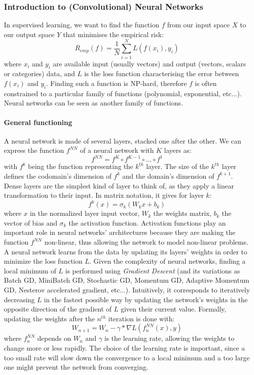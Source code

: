 \documentclass{article}
\begin{document}
\subsubsection{Introduction to (Convolutional) Neural Networks}
\label{sec:cnn}

In supervised learning, we want to find the function $f$ from our input space $X$ to our output space $Y$ that minimises the empirical risk:
$$R_{emp}(f) = \frac{1}{N}\sum_{i=1}^N L(f(x_i), y_i)$$
where $x_i$ and $y_i$ are available input (usually vectors) and output (vectors, scalars or categories) data, and $L$ is the loss function characterising the error between $f(x_i)$ and $y_i$. Finding such a function is NP-hard, therefore $f$ is often constrained to a particular family of functions (polynomial, exponential, etc...). Neural networks can be seen as another family of functions.

\paragraph{General functioning}
A neural network is made of several layers, stacked one after the other. We can express the function $f^{NN}$ of a neural network with $K$ layers as:
$$f^{NN} = f^K \circ f^{K-1} \circ ... \circ f^1$$
with $f^k$ being the function representing the $k^{th}$ layer. The size of the $k^{th}$ layer defines the codomain's dimension of $f^k$ and the domain's dimension of $f^{k+1}$. \\
Dense layers are the simplest kind of layer to think of, as they apply a linear transformation to their input. In matrix notation, it gives for layer $k$:
$$f^k(x) = \sigma_k(W_kx+b_k)$$
where $x$ in the normalized layer input vector, $W_k$ the weights matrix, $b_k$ the vector of bias and $\sigma_k$ the activation function. Activation functions play an important role in neural networks' architectures because they are making the function $f^{NN}$ non-linear, thus allowing the network to model non-linear problems. \\
A neural network learns from the data by updating its layers' weights in order to minimize the loss function $L$. Given the complexity of neural networks, finding a local minimum of $L$ is performed using \textit{Gradient Descent} (and its variations as Batch GD, MiniBatch GD, Stochastic GD, Momentum GD, Adaptive Momentum GD, Nesterov accelerated gradient, etc...). Intuitively, it corresponds to iteratively decreasing $L$ in the fastest possible way by updating the network's weights in the opposite direction of the gradient of $L$ given their current value. Formally, updating the weights after the $n^{th}$ iteration is done with:
$$W_{n+1} = W_n - \gamma * \nabla L(f^{NN}_n(x), y)$$
where $f^{NN}_n$ depends on $W_n$ and $\gamma$ is the learning rate, allowing the weights to change more or less rapidly. The choice of the learning rate is important, since a too small rate will slow down the convergence to a local minimum and a too large one might prevent the network from converging.
\end{document}
